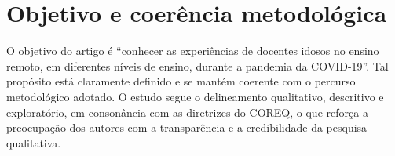 \chapter{Objetivo e coerência metodológica} \label{cap:fundamentacao} 

O objetivo do artigo é “conhecer as experiências de docentes idosos no ensino remoto, em diferentes níveis de ensino, durante a pandemia da COVID-19”. Tal propósito está claramente definido e se mantém coerente com o percurso metodológico adotado. O estudo segue o delineamento qualitativo, descritivo e exploratório, em consonância com as diretrizes do COREQ, o que reforça a preocupação dos autores com a transparência e a credibilidade da pesquisa qualitativa.

